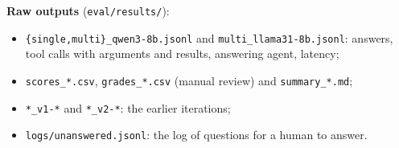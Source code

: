 \documentclass[11pt,a4paper]{article}
\newcommand{\code}[1]{\texttt{#1}}
\begin{document}
\noindent\textbf{Raw outputs} (\code{eval/results/}):
\begin{itemize}
  \item \code{\{single,multi\}\_qwen3-8b.jsonl} and \code{multi\_llama31-8b.jsonl}: answers, tool calls with
        arguments and results, answering agent, latency;
  \item \code{scores\_*.csv}, \code{grades\_*.csv} (manual review) and \code{summary\_*.md};
  \item \code{*\_v1-*} and \code{*\_v2-*}: the earlier iterations;
  \item \code{logs/unanswered.jsonl}: the log of questions for a human to answer.
\end{itemize}
\end{document}
